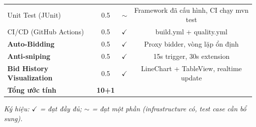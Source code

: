 \documentclass[12pt,a4paper]{article}
\begin{document}
\begin{longtable}{@{}p{7cm}ccc@{}}
  Unit Test (JUnit)                  & 0.5 & $\sim$       & Framework đã cấu hình, CI chạy mvn test \\
  CI/CD (GitHub Actions)             & 0.5 & $\checkmark$ & build.yml + quality.yml \\
  \midrule
  \textbf{Auto-Bidding}              & 0.5 & $\checkmark$ & Proxy bidder, vòng lặp ổn định \\
  \textbf{Anti-sniping}              & 0.5 & $\checkmark$ & 15s trigger, 30s extension \\
  \textbf{Bid History Visualization} & 0.5 & $\checkmark$ & LineChart + TableView, realtime update \\
  \midrule
  \textbf{Tổng ước tính}             & \textbf{10+1} & & \\
  \bottomrule
\end{longtable}

\vspace{1em}
\noindent\textit{Ký hiệu: $\checkmark$ = đạt đầy đủ; $\sim$ = đạt một phần (infrastructure có, test case cần bổ sung).}
\end{document}
